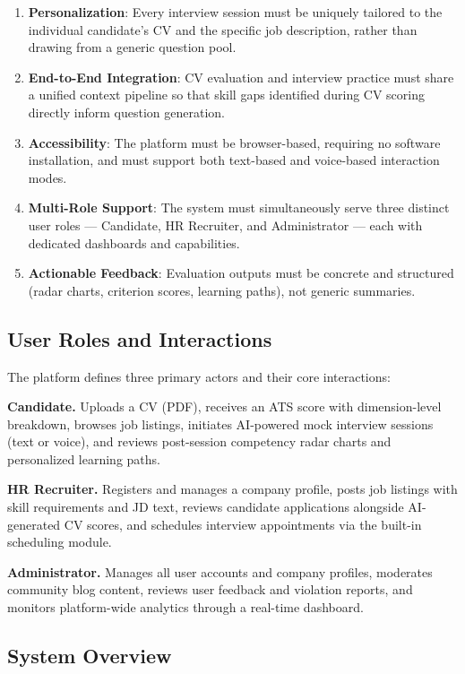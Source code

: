 \documentclass[pdflatex,sn-mathphys-num]{sn-jnl}%
\theoremstyle{thmstyleone}%
\theoremstyle{thmstyletwo}%
\theoremstyle{thmstylethree}%
\begin{document}
\begin{enumerate}
  \item \textbf{Personalization}: Every interview session must be uniquely tailored to the individual candidate's CV and the specific job description, rather than drawing from a generic question pool.
  \item \textbf{End-to-End Integration}: CV evaluation and interview practice must share a unified context pipeline so that skill gaps identified during CV scoring directly inform question generation.
  \item \textbf{Accessibility}: The platform must be browser-based, requiring no software installation, and must support both text-based and voice-based interaction modes.
  \item \textbf{Multi-Role Support}: The system must simultaneously serve three distinct user roles — Candidate, HR Recruiter, and Administrator — each with dedicated dashboards and capabilities.
  \item \textbf{Actionable Feedback}: Evaluation outputs must be concrete and structured (radar charts, criterion scores, learning paths), not generic summaries.
\end{enumerate}

\subsection{User Roles and Interactions}\label{subsec3-roles}

The platform defines three primary actors and their core interactions:

\textbf{Candidate.} Uploads a CV (PDF), receives an ATS score with dimension-level breakdown, browses job listings, initiates AI-powered mock interview sessions (text or voice), and reviews post-session competency radar charts and personalized learning paths.

\textbf{HR Recruiter.} Registers and manages a company profile, posts job listings with skill requirements and JD text, reviews candidate applications alongside AI-generated CV scores, and schedules interview appointments via the built-in scheduling module.

\textbf{Administrator.} Manages all user accounts and company profiles, moderates community blog content, reviews user feedback and violation reports, and monitors platform-wide analytics through a real-time dashboard.

\subsection{System Overview}\label{subsec3-overview}
\end{document}
